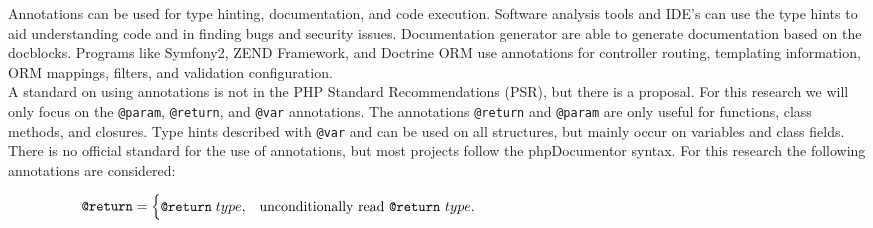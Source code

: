 \documentclass[../main.tex]{subfiles}
\begin{document}
    

    Annotations can be used for type hinting, documentation, and code execution.
    Software analysis tools and IDE's can use the type hints to aid understanding code and in finding bugs and security issues.
    Documentation generator are able to generate documentation based on the docblocks.
    Programs like Symfony2, ZEND Framework, and Doctrine ORM use annotations for controller routing, templating information, ORM mappings, filters, and validation configuration.
    \\
    A standard on using annotations is not in the PHP Standard Recommendations (\gls{PSR}), but there is a proposal\footnotemark{}.
    For this research we will only focus on the \texttt{@param}, \texttt{@return}, and \texttt{@var} annotations.
    The annotations \texttt{@return} and \texttt{@param} are only useful for functions, class methods, and closures.
    Type hints described with \texttt{@var} and can be used on all structures, but mainly occur on variables and class fields.
    \\
    There is no official standard for the use of annotations, but most projects follow the phpDocumentor\footnotemark{} syntax.
    For this research the following annotations are considered:

\begin{equation}\label{eq:return}
  \begin{aligned}
  \texttt{@return}=\begin{cases}
    \texttt{@return} \; type, & \text{unconditionally read \texttt{@return} $type$}.\\
  \end{cases}
  \end{aligned}
  \phantom{\hspace{8cm}} %
\end{equation}
\end{document}

